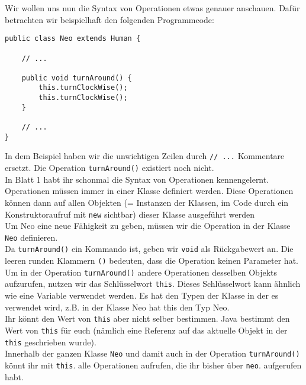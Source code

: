 \begin{Infobox}
    Wir wollen uns nun die Syntax von Operationen etwas genauer anschauen. 
    Dafür betrachten wir beispielhaft den folgenden Programmcode:

    \begin{lstlisting}[numbers=none]
public class Neo extends Human {

    // ...

    public void turnAround() {
        this.turnClockWise();
        this.turnClockWise();
    }

    // ...
}
    \end{lstlisting}

    In dem Beispiel haben wir die unwichtigen Zeilen durch \lstinline{// ...} Kommentare ersetzt.
    Die Operation \lstinline{turnAround()} existiert noch nicht.\\

    In Blatt 1 habt ihr schonmal die Syntax von Operationen kennengelernt.
    Operationen müssen immer in einer Klasse definiert werden.
    Diese Operationen können dann auf allen Objekten (= Instanzen
der Klassen, im Code durch ein Konstruktoraufruf mit \lstinline{new} sichtbar) dieser Klasse ausgeführt
werden\\

    Um Neo eine neue Fähigkeit zu geben, müssen wir die Operation in der Klasse \lstinline{Neo} definieren.\\

    Da \lstinline{turnAround()} ein Kommando ist, geben wir \lstinline{void} als Rückgabewert an.
    Die leeren runden Klammern \lstinline{()} bedeuten, dass die Operation keinen Parameter hat.\\

    Um in der Operation \lstinline{turnAround()} andere Operationen desselben Objekts aufzurufen, nutzen wir das Schlüsselwort \lstinline{this}.
    Dieses Schlüsselwort kann ähnlich wie eine Variable verwendet werden. Es hat den Typen der Klasse in der es verwendet wird, z.B. in der Klasse Neo hat this den Typ Neo.\\

    Ihr könnt den Wert von \lstinline{this} aber nicht selber bestimmen.
    Java bestimmt den Wert von \lstinline{this} für euch (nämlich eine Referenz auf das aktuelle Objekt in der \lstinline{this} geschrieben wurde).\\

    Innerhalb der ganzen Klasse \lstinline{Neo} und damit auch in der Operation \lstinline{turnAround()} könnt ihr mit \lstinline{this}. alle Operationen aufrufen, die ihr bisher über \lstinline{neo}. aufgerufen habt.

\end{Infobox}


